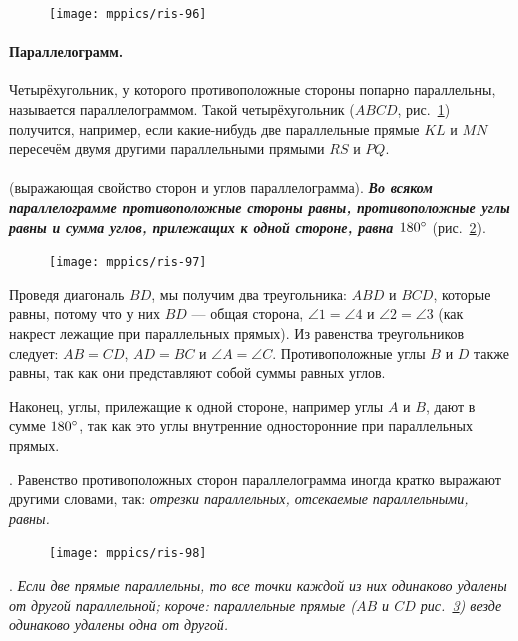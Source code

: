 \documentclass[oneside]{book}
\begin{document}
\begin{figure}
\centering
\texttt{[image: mppics/ris-96]}
\caption{}\label{1938/ris-96}
\end{figure}

\paragraph{Параллелограмм.}\label{1938/87}
Четырёхугольник, у которого противоположные стороны попарно параллельны, называется параллелограммом.
Такой четырёхугольник ($ABCD$, рис.~\ref{1938/ris-96}) получится, например, если какие-нибудь две параллельные прямые $KL$ и $MN$ пересечём двумя другими параллельными прямыми $RS$ и $PQ$.

\paragraph{}\label{1938/88}
 (выражающая свойство сторон и углов параллелограмма).
\textbf{\emph{Во всяком параллелограмме противоположные стороны равны, противоположные углы равны и сумма углов, прилежащих к одной стороне, равна $180\degree$}} (рис.~\ref{1938/ris-97}).

\begin{figure}
\centering
\texttt{[image: mppics/ris-97]}
\caption{}\label{1938/ris-97}
\end{figure}

Проведя диагональ $BD$, мы получим два треугольника:
$ABD$ и $BCD$, которые равны, потому что у них $BD$ — общая сторона, $\angle 1 = \angle 4$ и $\angle 2 = \angle 3$ (как накрест лежащие при параллельных прямых).
Из равенства треугольников следует:
$AB=CD$, $AD=BC$ и $\angle A = \angle C$.
Противоположные углы $B$ и $D$ также равны, так как они представляют собой суммы равных углов.

Наконец, углы, прилежащие к одной стороне, например углы $A$ и $B$, дают в сумме $180\degree$, так как это углы внутренние односторонние при параллельных прямых.

.
Равенство противоположных сторон параллелограмма иногда кратко выражают другими словами, так:
\emph{отрезки параллельных, отсекаемые параллельными, равны.}

\begin{figure}
\centering
\vskip-2mm
\texttt{[image: mppics/ris-98]}
\caption{}\label{1938/ris-98}
\end{figure}

\mbox{.}
\emph{Если две прямые параллельны, то все точки каждой из них одинаково удалены от другой параллельной;
короче:
параллельные прямые \emph{($AB$ и $CD$ рис.~\ref{1938/ris-98})} везде одинаково удалены одна от другой.}
\end{document}
